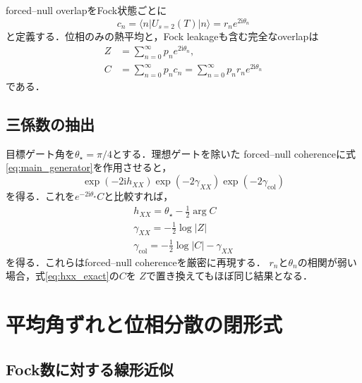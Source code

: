 \documentclass[dvipdfmx,a4paper,10pt]{jsarticle}
\newcommand{\ii}{\mathrm{i}}
\newcommand{\ket}[1]{\lvert #1\rangle}
\newcommand{\bra}[1]{\langle #1\rvert}
\begin{document}
forced--null overlapをFock状態ごとに
\begin{equation}
 c_n
 =\bra{n}U_{s=2}(T)\ket{n}
 =r_ne^{2\ii\theta_n}
 \label{eq:c_n}
\end{equation}
と定義する．位相のみの熱平均と，Fock leakageも含む完全なoverlapは
\begin{align}
 Z&=\sum_{n=0}^{\infty}p_ne^{2\ii\theta_n},
 \label{eq:Z_definition}\\
 C&=\sum_{n=0}^{\infty}p_nc_n
 =\sum_{n=0}^{\infty}p_nr_ne^{2\ii\theta_n}
 \label{eq:C_definition}
\end{align}
である．

\subsection{三係数の抽出}

目標ゲート角を$\theta_\star=\pi/4$とする．理想ゲートを除いた
forced--null coherenceに式\eqref{eq:main_generator}を作用させると，
\begin{equation}
 \exp(-2\ii h_{XX})
 \exp(-2\gamma_{XX})
 \exp(-2\gamma_{\mathrm{col}})
 \label{eq:generator_coherence}
\end{equation}
を得る．これを$e^{-2\ii\theta_\star}C$と比較すれば，
\begin{align}
 \boxed{
 h_{XX}
 =\theta_\star-\frac{1}{2}\arg C
 }
 \label{eq:hxx_exact}\\
 \boxed{
 \gamma_{XX}
 =-\frac{1}{2}\log|Z|
 }
 \label{eq:gammaxx_exact}\\
 \boxed{
 \gamma_{\mathrm{col}}
 =-\frac{1}{2}\log|C|-\gamma_{XX}
 }
 \label{eq:gammacol_exact}
\end{align}
を得る．これらはforced--null coherenceを厳密に再現する．
$r_n$と$\theta_n$の相関が弱い場合，式\eqref{eq:hxx_exact}の$C$を
$Z$で置き換えてもほぼ同じ結果となる．

\section{平均角ずれと位相分散の閉形式}

\subsection{Fock数に対する線形近似}
\end{document}
